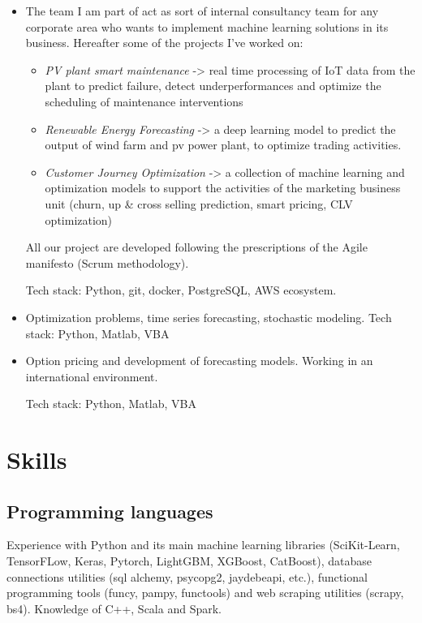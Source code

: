 \documentclass[11pt,a4paper,sans]{moderncv}        %
\begin{document}
\begin{itemize}
\item{
The team I am part of act as sort of internal consultancy team for any corporate area who wants to implement machine learning solutions in its business. Hereafter some of the projects I've worked on:
\smallskip
\begin{itemize}
\item{\emph{PV plant smart maintenance} -> real time processing of IoT data from the plant to predict failure, detect underperformances and optimize the scheduling of maintenance interventions}
\item{\emph{Renewable Energy Forecasting} -> a deep learning model to predict the output of wind farm and pv power plant, to optimize trading activities.}
\item{\emph{Customer Journey Optimization} -> a collection of machine learning and optimization models to support the activities of the marketing business unit (churn, up \& cross selling prediction, smart pricing, CLV optimization)}
\end{itemize} 
\smallskip
All our project are developed following the prescriptions of the Agile manifesto (Scrum methodology). 

Tech stack: Python, git, docker, PostgreSQL, AWS ecosystem.}
\item{
Optimization problems, time series forecasting, stochastic modeling. Tech stack: Python, Matlab, VBA}
\item{
Option pricing and development of forecasting models. Working in an international environment.

Tech stack: Python, Matlab, VBA}
\end{itemize}

\section{Skills}
\subsection{Programming languages}
Experience with Python and its main machine learning libraries (SciKit-Learn, TensorFLow, Keras, Pytorch, LightGBM, XGBoost, CatBoost), database connections utilities (sql alchemy, psycopg2, jaydebeapi, etc.), functional programming tools (funcy, pampy, functools) and web scraping utilities (scrapy, bs4). Knowledge of C++, Scala and Spark.
\end{document}
